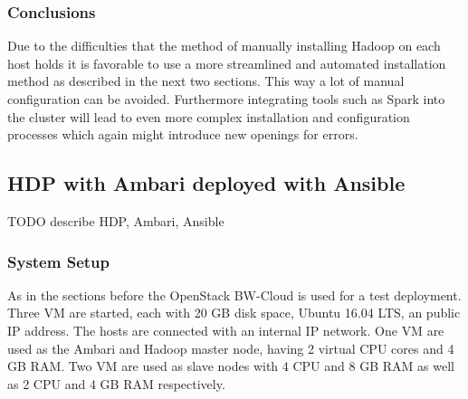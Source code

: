 \subsubsection{Conclusions}

Due to the difficulties that the method of manually installing Hadoop on each host holds it is favorable to use a more streamlined 
and automated installation method as described in the next two sections.
This way a lot of manual configuration can be avoided.
Furthermore integrating tools such as Spark into the cluster 
will lead to even more complex installation and configuration processes which again might introduce new openings for errors.

\subsection{\acl{HDP} with Ambari deployed with Ansible}
TODO describe HDP, Ambari, Ansible

\subsubsection{System Setup}

As in the sections before the OpenStack BW-Cloud is used for a test deployment.
Three \acs{VM} are started, each with 20 \ac{GB} disk space, Ubuntu 16.04 \ac{LTS}, an public \ac{IP} address. 
The hosts are connected with an internal \ac{IP} network.
One \ac{VM} are used as the Ambari and Hadoop master node, having 2 virtual \ac{CPU} cores and 4 \ac{GB} \ac{RAM}.
Two \acs{VM} are used as slave nodes with 4 \acs{CPU} and 8 \ac{GB} \ac{RAM} as well as 2 \acs{CPU} and 4 \ac{GB} \ac{RAM} respectively.

